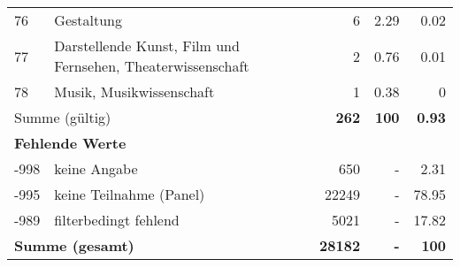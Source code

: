 \begin{longtable}{lXrrr}
        76 & \multicolumn{1}{X}{Gestaltung} & %
          \num{6} &
          \num[round-mode=places,round-precision=2]{2.29} &
          \num[round-mode=places,round-precision=2]{0.02} \\

        77 & \multicolumn{1}{X}{Darstellende Kunst, Film und Fernsehen, Theaterwissenschaft} & %
          \num{2} &
          \num[round-mode=places,round-precision=2]{0.76} &
          \num[round-mode=places,round-precision=2]{0.01} \\

        78 & \multicolumn{1}{X}{Musik, Musikwissenschaft} & %
          \num{1} &
          \num[round-mode=places,round-precision=2]{0.38} &
          \num[round-mode=places,round-precision=2]{0} \\

     \midrule
     \multicolumn{2}{l}{Summe (gültig)} &
       \textbf{\num{262}} &
     \textbf{\num{100}} &
       \textbf{\num[round-mode=places,round-precision=2]{0.93}} \\
     \multicolumn{5}{l}{\textbf{Fehlende Werte}}\\
       -998 &
       keine Angabe &
         \num{650} &
        - &
         \num[round-mode=places,round-precision=2]{2.31} \\
       -995 &
       keine Teilnahme (Panel) &
         \num{22249} &
        - &
         \num[round-mode=places,round-precision=2]{78.95} \\
       -989 &
       filterbedingt fehlend &
         \num{5021} &
        - &
         \num[round-mode=places,round-precision=2]{17.82} \\
     \midrule
     \multicolumn{2}{l}{\textbf{Summe (gesamt)}} &
          \textbf{\num{28182}} &
        \textbf{-} &
        \textbf{\num{100}} \\
     \bottomrule
     \end{longtable}
     
